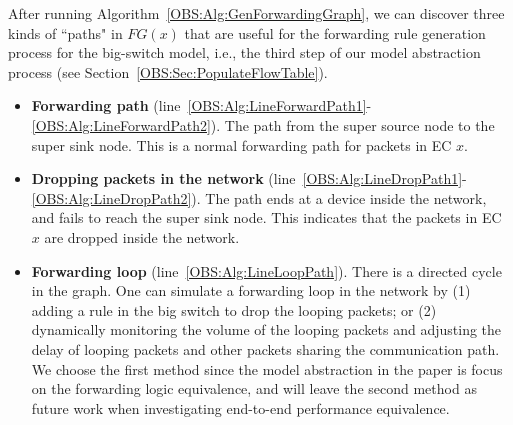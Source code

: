 After running Algorithm~\ref{OBS:Alg:GenForwardingGraph}, we can discover three kinds of ``paths" in $FG(x)$
that are useful for the forwarding rule generation process for the big-switch model,
i.e., the third step of our model abstraction process (see Section~\ref{OBS:Sec:PopulateFlowTable}).

\begin{itemize}
\item \textbf{Forwarding path} (line~\ref{OBS:Alg:LineForwardPath1}-\ref{OBS:Alg:LineForwardPath2}).
        The path from the super source node to the super sink node.
        This is a normal forwarding path for packets in EC $x$.

\item \textbf{Dropping packets in the network} (line~\ref{OBS:Alg:LineDropPath1}-\ref{OBS:Alg:LineDropPath2}).
        The path ends at a device inside the network, and fails to reach the super sink node. This indicates that the packets in EC $x$ are dropped inside the network.

\item \textbf{Forwarding loop} (line~\ref{OBS:Alg:LineLoopPath}).
        There is a directed cycle in the graph. One can simulate a forwarding loop in the network by (1) adding a rule in the big switch to drop the looping packets; or (2) dynamically monitoring the volume of the looping packets and adjusting the delay of looping packets and other packets sharing the communication path. We choose the first method since the model abstraction in the paper is focus on the forwarding logic equivalence, and will leave the second method as future work when investigating end-to-end performance equivalence.
\end{itemize}

\label{OBS:Sec:PopulateFlowTable}

